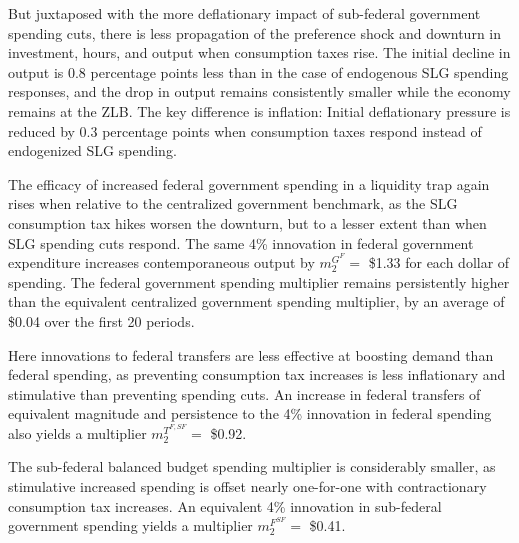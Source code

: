 \documentclass[12pt,letterpaper]{article}
\begin{document}
But juxtaposed with the more deflationary impact of sub-federal government spending cuts, there is less propagation of the preference shock and downturn in investment, hours, and output when consumption taxes rise. The initial decline in output is 0.8 percentage points less than in the case of endogenous SLG spending responses, and the drop in output remains consistently smaller while the economy remains at the ZLB. The key difference is inflation: Initial deflationary pressure is reduced by 0.3 percentage points when consumption taxes respond instead of endogenized SLG spending. 


The efficacy of increased federal government spending in a liquidity trap again rises when relative to the centralized government benchmark, as the SLG consumption tax hikes worsen the downturn, but to a lesser extent than when SLG spending cuts respond. The same 4\% innovation in federal government expenditure increases contemporaneous output by $m^{G^F}_2 = $ \$1.33 for each dollar of spending. The federal government spending multiplier remains persistently higher than the equivalent centralized government spending multiplier, by an average of \$0.04 over the first 20 periods. 

Here innovations to federal transfers are less effective at boosting demand than federal spending, as preventing consumption tax increases is less inflationary and stimulative than preventing spending cuts. An increase in federal transfers of equivalent magnitude and persistence to the 4\% innovation in federal spending also yields a multiplier $m^{T^{F,SF}}_2 = $ \$0.92. 

The sub-federal balanced budget spending multiplier is considerably smaller, as stimulative increased spending is offset nearly one-for-one with contractionary consumption tax increases. An equivalent 4\% innovation in sub-federal government spending yields a multiplier $m^{F^{SF}}_2 = $ \$0.41. 

 \bigskip
\end{document}
